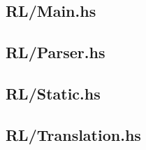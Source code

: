 \subsection{RL/Main.hs}
\label{app:RL_Main_hs}

\subsection{RL/Parser.hs}
\label{app:RL_Parser_hs}

\subsection{RL/Static.hs}
\label{app:RL_Static_hs}

\subsection{RL/Translation.hs}
\label{app:RL_Translation_hs}

